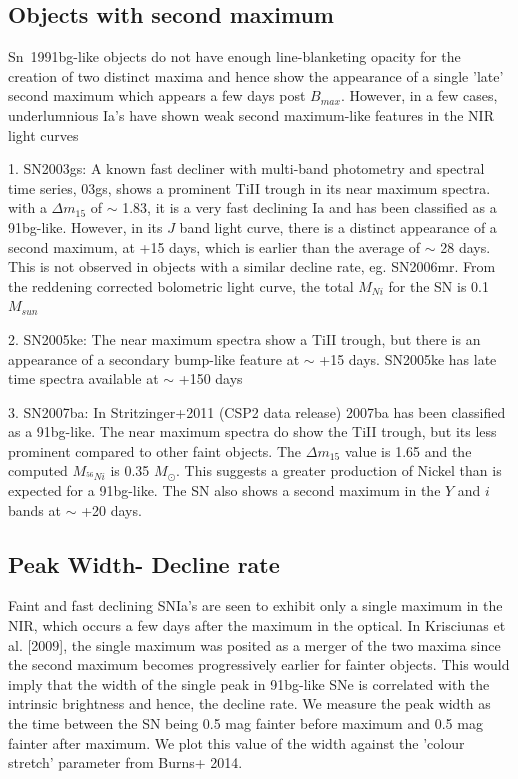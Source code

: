 \documentclass{article}
\begin{document}
\subsection{Objects with second maximum}
Sn~1991bg-like objects do not have enough line-blanketing opacity for the creation of two distinct maxima and hence show the appearance of a single 'late' second maximum which appears a few days post $B_{max}$. However, in a few cases, underlumnious Ia's have shown weak second maximum-like features in the NIR light curves

1. SN2003gs: A known fast decliner with multi-band photometry and spectral time series, 03gs, shows a prominent TiII trough in its near maximum spectra. with a $\Delta m_{15}$ of $\sim$ 1.83, it is a very fast declining Ia and has been classified as a 91bg-like. 
However, in its $J$ band light curve, there is a distinct appearance of a second maximum, at +15 days, which is earlier than the average of $\sim$ 28 days. This is not observed in objects with a similar decline rate, eg. SN2006mr. From the reddening corrected bolometric light curve, the total $M_{Ni}$ for the SN is 0.1 $M_{sun}$

2. SN2005ke:
The near maximum spectra show a TiII trough, but there is an appearance of a secondary bump-like feature at $\sim$ +15 days. SN2005ke has late time spectra available at $\sim$ +150 days 


3. SN2007ba: 
In Stritzinger+2011 (CSP2 data release) 2007ba has been classified as a 91bg-like. The near maximum spectra do show the TiII trough, but its less prominent compared to other faint objects. 
The $\Delta m_{15}$ value is 1.65 and the computed $M_{^{56}Ni}$ is 0.35  $M_{\odot}$. This suggests a greater production of Nickel than is expected for a 91bg-like.
The SN also shows a second maximum in the $Y$ and $i$ bands at $\sim$ +20 days. 

\subsection{Peak Width- Decline rate}
Faint and fast declining SNIa's are seen to exhibit only a single maximum in the NIR, which occurs a few days after the maximum in the optical. In Krisciunas et al. [2009], the single maximum was posited as a merger of the two maxima since the second maximum becomes progressively earlier for fainter objects. This would imply that the width of the single peak in 91bg-like SNe is correlated with the intrinsic brightness and hence, the decline rate. 
We measure the peak width as the time between the SN being 0.5 mag fainter before maximum and 0.5 mag fainter after maximum. We plot this value of the width against the 'colour stretch' parameter from Burns+ 2014. 
\end{document}
